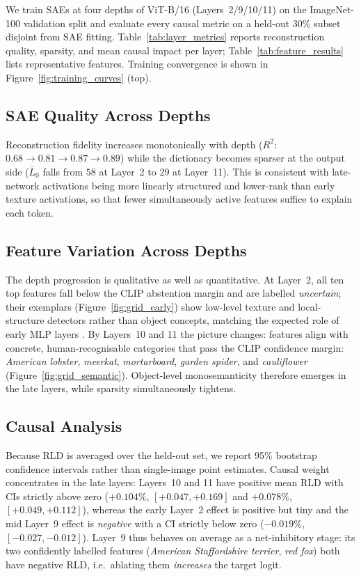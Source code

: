 We train SAEs at four depths of ViT-B/16 (Layers~2/9/10/11) on the ImageNet-100 validation split and evaluate every causal metric on a held-out 30\% subset disjoint from SAE fitting. Table~\ref{tab:layer_metrics} reports reconstruction quality, sparsity, and mean causal impact per layer; Table~\ref{tab:feature_results} lists representative features. Training convergence is shown in Figure~\ref{fig:training_curves} (top).

\subsection{SAE Quality Across Depths}

Reconstruction fidelity increases monotonically with depth ($R^2$: $0.68\!\to\!0.81\!\to\!0.87\!\to\!0.89$) while the dictionary becomes sparser at the output side ($\bar{L}_0$ falls from $58$ at Layer~2 to $29$ at Layer~11). This is consistent with late-network activations being more linearly structured and lower-rank than early texture activations, so that fewer simultaneously active features suffice to explain each token.

\subsection{Feature Variation Across Depths}

The depth progression is qualitative as well as quantitative. At Layer~2, all ten top features fall below the CLIP abstention margin and are labelled \emph{uncertain}; their exemplars (Figure~\ref{fig:grid_early}) show low-level texture and local-structure detectors rather than object concepts, matching the expected role of early MLP layers \cite{Raghu2021}. By Layers~10 and 11 the picture changes: features align with concrete, human-recognisable categories that pass the CLIP confidence margin: \textit{American lobster}, \textit{meerkat}, \textit{mortarboard}, \textit{garden spider}, and \textit{cauliflower} (Figure~\ref{fig:grid_semantic}). Object-level monosemanticity therefore emerges in the late layers, while sparsity simultaneously tightens.

\subsection{Causal Analysis}

Because RLD is averaged over the held-out set, we report 95\% bootstrap confidence intervals rather than single-image point estimates. Causal weight concentrates in the late layers: Layers~10 and 11 have positive mean RLD with CIs strictly above zero ($+0.104\%$, $[+0.047,+0.169]$ and $+0.078\%$, $[+0.049,+0.112]$), whereas the early Layer~2 effect is positive but tiny and the mid Layer~9 effect is \emph{negative} with a CI strictly below zero ($-0.019\%$, $[-0.027,-0.012]$). Layer~9 thus behaves on average as a net-inhibitory stage: its two confidently labelled features (\textit{American Staffordshire terrier}, \textit{red fox}) both have negative RLD, i.e.\ ablating them \emph{increases} the target logit.

